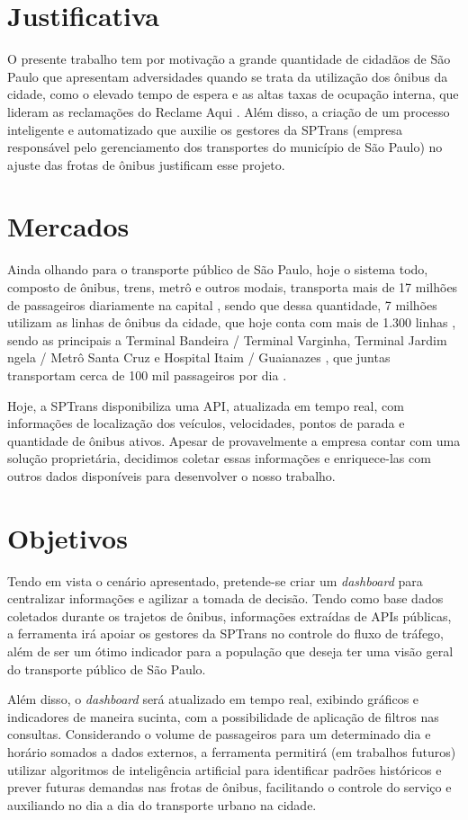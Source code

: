 \section{Justificativa}
\indent
\par O presente trabalho tem por motivação a grande quantidade de cidadãos de São Paulo que apresentam adversidades quando se trata da utilização dos ônibus da cidade, como o elevado tempo de espera e as altas taxas de ocupação interna, que lideram as reclamações do Reclame Aqui \cite{ReclameAqui1} \cite{ReclameAqui2}. Além disso, a criação de um processo inteligente e automatizado que auxilie os gestores da SPTrans (empresa responsável pelo gerenciamento dos transportes do município de São Paulo) no ajuste das frotas de ônibus justificam esse projeto.

\section{Mercados}
\indent
\par Ainda olhando para o transporte público de São Paulo, hoje o sistema todo, composto de ônibus, trens, metrô e outros modais, transporta mais de 17 milhões de passageiros diariamente na capital \cite{G1SaoPaulo}, sendo que dessa quantidade, 7 milhões utilizam as linhas de ônibus da cidade, que hoje conta com mais de 1.300 linhas \cite{MobilidadeSampa}, sendo as principais a Terminal Bandeira / Terminal Varginha, Terminal Jardim  ngela / Metrô Santa Cruz e Hospital Itaim / Guaianazes , que juntas transportam cerca de 100 mil passageiros por dia \cite{Viatrolebus}.
\par Hoje, a SPTrans disponibiliza uma API, atualizada em tempo real, com informações de localização dos veículos, velocidades, pontos de parada e quantidade de ônibus ativos. Apesar de provavelmente a empresa contar com uma solução proprietária, decidimos coletar essas informações e enriquece-las com outros dados disponíveis para desenvolver o nosso trabalho.

\section{Objetivos}
\indent
\par Tendo em vista o cenário apresentado, pretende-se criar um \textit{dashboard} para centralizar informações e agilizar a tomada de decisão. Tendo como base dados coletados durante os trajetos de ônibus, informações extraídas de APIs públicas,  a ferramenta irá apoiar os gestores da SPTrans no controle do fluxo de tráfego, além de ser um ótimo indicador para a população que deseja ter uma visão geral do transporte público de São Paulo. 
\par Além disso, o \textit{dashboard} será atualizado em tempo real, exibindo gráficos e indicadores de maneira sucinta, com a possibilidade de aplicação de filtros nas consultas. Considerando o volume de passageiros para um determinado dia e horário somados a dados externos, a ferramenta permitirá (em trabalhos futuros) utilizar algoritmos de inteligência artificial para identificar padrões históricos e prever futuras demandas nas frotas de ônibus, facilitando o controle do serviço e auxiliando no dia a dia do transporte urbano na cidade.

